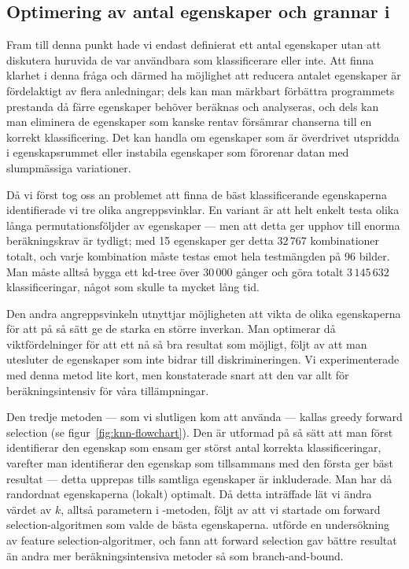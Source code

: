 \documentclass[../rapport_MVEX01-11-05]{subfiles}
\begin{document}
\subsection{Optimering av antal egenskaper och grannar i \knn}
Fram till denna punkt hade vi endast definierat ett antal egenskaper utan att
diskutera huruvida de var användbara som klassificerare eller inte. Att finna
klarhet i denna fråga och därmed ha möjlighet att reducera antalet egenskaper är
fördelaktigt av flera anledningar; dels kan man märkbart förbättra programmets
prestanda då färre egenskaper behöver beräknas och analyseras, och dels kan man
eliminera de egenskaper som kanske rentav försämrar chanserna till en korrekt
klassificering. Det kan handla om egenskaper som är överdrivet utspridda i
egenskapsrummet eller instabila egenskaper som förorenar datan med slumpmässiga
variationer.

Då vi först tog oss an problemet att finna de bäst klassificerande
egenskaperna identifierade vi tre olika angreppsvinklar. En variant är att helt
enkelt testa olika långa permutationsföljder av egenskaper ---
men att detta ger upphov till enorma beräkningskrav är tydligt; med 15
egenskaper ger detta $32\,767$ kombinationer totalt, och varje kombination
måste testas emot hela testmängden på 96 bilder. Man måste alltså bygga ett
kd-tree över $30\,000$ gånger och göra totalt $3\,145\,632$ klassificeringar,
något som skulle ta mycket lång tid.
 
Den andra angreppsvinkeln utnyttjar
möjligheten att vikta de olika egenskaperna för att på så sätt ge de starka en
större inverkan. Man optimerar då
viktfördelninger för att ett nå så bra resultat som möjligt, följt av att man
utesluter de egenskaper som inte bidrar till diskrimineringen. Vi experimenterade
med denna metod lite kort, men konstaterade snart att den var allt för 
beräkningsintensiv för våra tillämpningar.

Den tredje metoden --- som vi slutligen kom att
använda --- kallas greedy forward selection (se
 figur~\ref{fig:knn-flowchart}). Den är utformad på så sätt att
man först identifierar den egenskap som
ensam ger störst antal korrekta klassificeringar, varefter
man identifierar den egenskap som tillsammans med den första ger
bäst resultat --- detta
upprepas tills samtliga egenskaper är inkluderade. Man har då randordnat
egenskaperna (lokalt) optimalt. Då detta
inträffade lät vi ändra värdet av $k$,
alltså parametern i \knn-metoden, följt av
att vi startade om forward selection-algoritmen som valde de bästa egenskaperna.
 utförde en undersökning av feature selection-algoritmer,
och fann att forward selection gav bättre resultat än andra mer beräkningsintensiva
metoder så som branch-and-bound.
\end{document}
